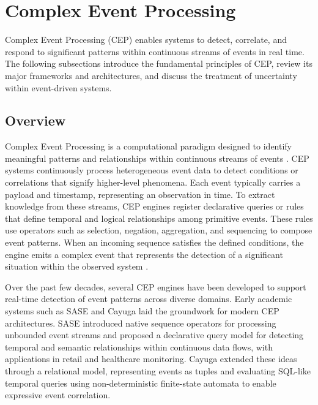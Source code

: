 



\section{Complex Event Processing}\label{sec:background-cep}
Complex Event Processing (CEP) enables systems to detect, correlate, and respond to significant patterns within continuous streams of events in real time. The following subsections introduce the fundamental principles of CEP, review its major frameworks and architectures, and discuss the treatment of uncertainty within event-driven systems.

\subsection{Overview}\label{subsec:background-cep-overview}
Complex Event Processing is a computational paradigm designed to identify meaningful patterns and relationships within continuous streams of events \citep{cugola2015complex}. CEP systems continuously process heterogeneous event data to detect conditions or correlations that signify higher-level phenomena. Each event typically carries a payload and timestamp, representing an observation in time. To extract knowledge from these streams, CEP engines register declarative queries or rules that define temporal and logical relationships among primitive events. These rules use operators such as selection, negation, aggregation, and sequencing to compose event patterns. When an incoming sequence satisfies the defined conditions, the engine emits a complex event that represents the detection of a significant situation within the observed system \citep{bok2018complex, gehani1992composite}.

Over the past few decades, several CEP engines have been developed to support real-time detection of event patterns across diverse domains. Early academic systems such as SASE \citep{wu2006high} and Cayuga \citep{brenna2007cayuga} laid the groundwork for modern CEP architectures. SASE introduced native sequence operators for processing unbounded event streams and proposed a declarative query model for detecting temporal and semantic relationships within continuous data flows, with applications in retail and healthcare monitoring. Cayuga extended these ideas through a relational model, representing events as tuples and evaluating SQL-like temporal queries using non-deterministic finite-state automata to enable expressive event correlation. 

